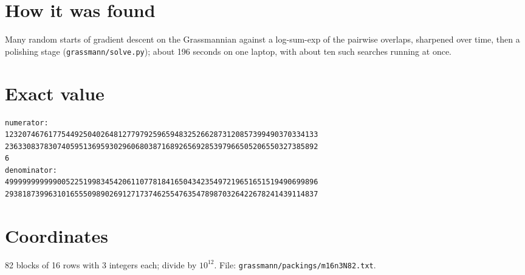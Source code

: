 \documentclass[11pt,a4paper]{article}
\begin{document}
\section{How it was found}
Many random starts of gradient descent on the Grassmannian against a log-sum-exp of the pairwise overlaps, sharpened over time, then a polishing stage (\texttt{grassmann/solve.py}); about 196 seconds on one laptop, with about ten such searches running at once.


\appendix
\section{Exact value}
{\small
\begin{verbatim}
numerator:
123207467617754492504026481277979259659483252662873120857399490370334133
236330837830740595136959302960680387168926569285397966505206550327385892
6
denominator:
499999999999005225199834542061107781841650434235497219651651519490699896
293818739963101655509890269127173746255476354789870326422678241439114837
\end{verbatim}}

\section{Coordinates}
82 blocks of 16 rows with 3 integers each; divide by $10^{12}$. File: \texttt{grassmann/packings/m16n3N82.txt}.
{\tiny
\begin{multicols}{3}
\end{multicols}}
\end{document}
